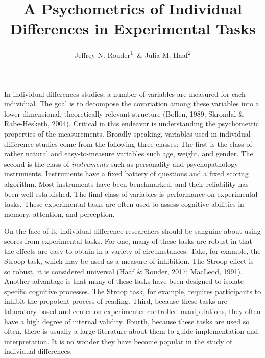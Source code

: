 \documentclass[english,man]{apa6}
\title{A Psychometrics of Individual Differences in Experimental Tasks}
\author{Jeffrey N. Rouder\textsuperscript{1}~\& Julia M. Haaf\textsuperscript{2}}
\affiliation{
    \vspace{0.5cm}
          \textsuperscript{1} University of California, Irvine\\
          \textsuperscript{2} University of Missouri  }
\theoremstyle{definition}
\theoremstyle{definition}
\theoremstyle{remark}
\begin{document}
\maketitle

\setcounter{secnumdepth}{0}



In individual-differences studies, a number of variables are measured
for each individual. The goal is to decompose the covariation among
these variables into a lower-dimensional, theoretically-relevant
structure (Bollen, 1989; Skrondal \& Rabe-Hesketh, 2004). Critical in
this endeavor is understanding the psychometric properties of the
measurements. Broadly speaking, variables used in individual-difference
studies come from the following three classes: The first is the class of
rather natural and easy-to-measure variables such age, weight, and
gender. The second is the class of \emph{instruments} such as
personality and psychopathology instruments. Instruments have a fixed
battery of questions and a fixed scoring algorithm. Most instruments
have been benchmarked, and their reliability has been well established.
The final class of variables is performance on experimental tasks. These
experimental tasks are often used to assess cognitive abilities in
memory, attention, and perception.

On the face of it, individual-difference researchers should be sanguine
about using scores from experimental tasks. For one, many of these tasks
are robust in that the effects are easy to obtain in a variety of
circumstances. Take, for example, the Stroop task, which may be used as
a measure of inhibition. The Stroop effect is so robust, it is
considered universal (Haaf \& Rouder, 2017; MacLeod, 1991). Another
advantage is that many of these tasks have been designed to isolate
specific cognitive processes. The Stroop task, for example, requires
participants to inhibit the prepotent process of reading. Third, because
these tasks are laboratory based and center on experimenter-controlled
manipulations, they often have a high degree of internal validity.
Fourth, because these tasks are used so often, there is usually a large
literature about them to guide implementation and interpretation. It is
no wonder they have become popular in the study of individual
differences.
\end{document}
